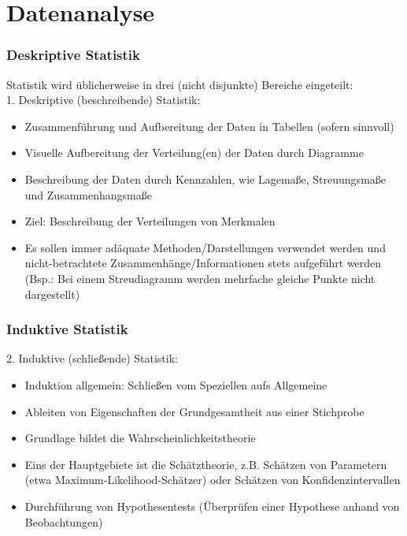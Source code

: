 \section{Datenanalyse}
\begin{frame}
\frametitle{Deskriptive Statistik}
Statistik wird üblicherweise in drei (nicht disjunkte) Bereiche eingeteilt:\\[0.2cm]
1. Deskriptive (beschreibende) Statistik:
\begin{itemize}[<+->]
\item Zusammenführung und Aufbereitung der Daten in Tabellen (sofern sinnvoll)
\item Visuelle Aufbereitung der Verteilung(en) der Daten durch Diagramme
\item Beschreibung der Daten durch Kennzahlen, wie Lagemaße, Streuungsmaße und Zusammenhangsmaße
\item Ziel: Beschreibung der Verteilungen von Merkmalen
\item Es sollen immer adäquate Methoden/Darstellungen verwendet werden und nicht-betrachtete Zusammenhänge/Informationen stets aufgeführt werden (Bsp.: Bei einem Streudiagramm werden mehrfache gleiche Punkte nicht dargestellt)
\end{itemize}
\end{frame}
\begin{frame}
\frametitle{Induktive Statistik}
2. Induktive (schließende) Statistik:
\begin{itemize}[<+->]
\item Induktion allgemein: Schließen vom Speziellen aufs Allgemeine
\item Ableiten von Eigenschaften der Grundgesamtheit aus einer Stichprobe
\item Grundlage bildet die Wahrscheinlichkeitstheorie
\item Eins der Hauptgebiete ist die Schätztheorie, z.B. Schätzen von Parametern (etwa Maximum-Likelihood-Schätzer) oder Schätzen von Konfidenzintervallen
\item Durchführung von Hypothesentests (Überprüfen einer Hypothese anhand von Beobachtungen)
\end{itemize}
\end{frame}
